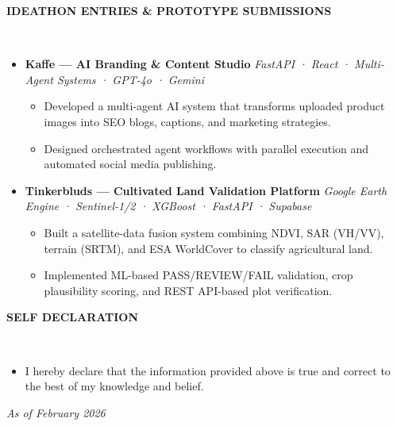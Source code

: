 \documentclass[10pt,a4paper]{article}
\newcommand{\resheading}[1]{{\small \colorbox{mygrey}{\begin{minipage}{0.99\textwidth}{\textbf{#1 \vphantom{p\^{E}}}}\end{minipage}}}}
\begin{document}
\noindent
\resheading{\textbf{IDEATHON ENTRIES \& PROTOTYPE SUBMISSIONS}}\\[-0.1cm]
\begin{itemize}[noitemsep,nolistsep]

\item \textbf{Kaffe — AI Branding \& Content Studio}  
\textit{FastAPI · React · Multi-Agent Systems · GPT-4o · Gemini}  
\begin{itemize}[noitemsep]
    \item Developed a multi-agent AI system that transforms uploaded product images into SEO blogs, captions, and marketing strategies.
    \item Designed orchestrated agent workflows with parallel execution and automated social media publishing.
\end{itemize}

\item \textbf{Tinkerbluds — Cultivated Land Validation Platform}  
\textit{Google Earth Engine · Sentinel-1/2 · XGBoost · FastAPI · Supabase}  
\begin{itemize}[noitemsep]
    \item Built a satellite-data fusion system combining NDVI, SAR (VH/VV), terrain (SRTM), and ESA WorldCover to classify agricultural land.
    \item Implemented ML-based PASS/REVIEW/FAIL validation, crop plausibility scoring, and REST API-based plot verification.
\end{itemize}

\end{itemize}

\vspace{0.2cm}

\vspace{0.2cm}

\noindent
\resheading{\textbf{SELF DECLARATION}}\\[-0.4cm]
\begin{itemize}[leftmargin=*]
    \item I hereby declare that the information provided above is true and correct to the best of my knowledge and belief.
\end{itemize}

\begin{center}
    {\footnotesize \textit{As of February 2026}}
\end{center}
\end{document}

